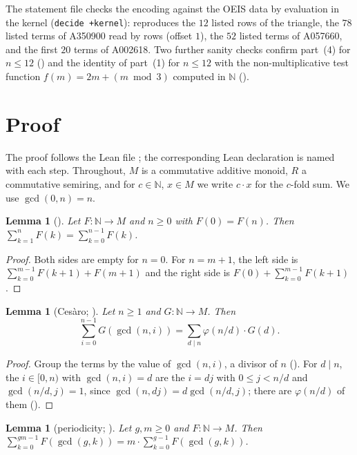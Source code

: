 \documentclass[11pt]{amsart}
\theoremstyle{plain}
\newtheorem{lemma}[theorem]{Lemma}
\theoremstyle{definition}
\newcommand{\N}{\mathbb{N}}
\begin{document}
The statement file checks the encoding against the OEIS data by evaluation in the kernel (\texttt{decide +kernel}):  reproduces the $12$ listed rows of the triangle,  the $78$ listed terms of A350900 read by rows (offset $1$),  the $52$ listed terms of A057660, and  the first $20$ terms of A002618. Two further sanity checks confirm part~(4) for $n\le12$ () and the identity of part~(1) for $n\le12$ with the non-multiplicative test function $f(m)=2m+(m\bmod 3)$ computed in $\N$ ().

\section{Proof}\label{sec:proof}

The proof follows the Lean file ; the corresponding Lean declaration is named with each step. Throughout, $M$ is a commutative additive monoid, $R$ a commutative semiring, and for $c\in\N$, $x\in M$ we write $c\cdot x$ for the $c$-fold sum. We use $\gcd(0,n)=n$.

\begin{lemma}[]\label{lem:shift}
Let $F\colon\N\to M$ and $n\ge0$ with $F(0)=F(n)$. Then $\sum_{k=1}^{n}F(k)=\sum_{k=0}^{n-1}F(k)$.
\end{lemma}

\begin{proof}
Both sides are empty for $n=0$. For $n=m+1$, the left side is $\sum_{k=0}^{m-1}F(k+1)+F(m+1)$ and the right side is $F(0)+\sum_{k=0}^{m-1}F(k+1)$.
\end{proof}

\begin{lemma}[Ces\`aro; ]\label{lem:cesaro}
Let $n\ge1$ and $G\colon\N\to M$. Then
\[ \sum_{i=0}^{n-1}G(\gcd(n,i))=\sum_{d\mid n}\varphi(n/d)\cdot G(d). \]
\end{lemma}

\begin{proof}
Group the terms by the value of $\gcd(n,i)$, a divisor of $n$ (). For $d\mid n$, the $i\in[0,n)$ with $\gcd(n,i)=d$ are the $i=dj$ with $0\le j<n/d$ and $\gcd(n/d,j)=1$, since $\gcd(n,dj)=d\gcd(n/d,j)$; there are $\varphi(n/d)$ of them ().
\end{proof}

\begin{lemma}[periodicity; ]\label{lem:period}
Let $g,m\ge0$ and $F\colon\N\to M$. Then $\sum_{k=0}^{gm-1}F(\gcd(g,k))=m\cdot\sum_{k=0}^{g-1}F(\gcd(g,k))$.
\end{lemma}
\end{document}
